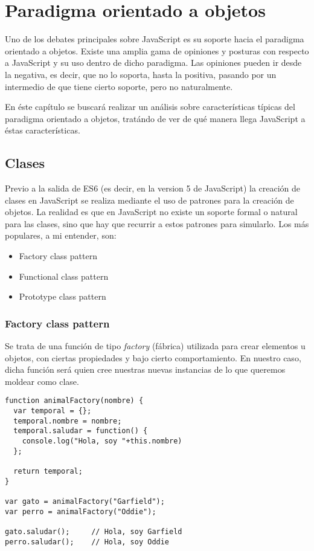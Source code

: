 \chapter{Paradigma orientado a objetos}

\label{Chapter4}


Uno de los debates principales sobre JavaScript es su soporte hacia el paradigma orientado a objetos. Existe una amplia gama de opiniones y posturas con respecto a JavaScript y su uso dentro de dicho paradigma. Las opiniones pueden ir desde la negativa, es decir, que no lo soporta, hasta la positiva, pasando por un intermedio de que tiene cierto soporte, pero no naturalmente.

En éste capítulo se buscará realizar un análisis sobre características típicas del paradigma orientado a objetos, tratándo de ver de qué manera llega JavaScript a éstas características.


\section{Clases}

Previo a la salida de ES6 (es decir, en la version 5 de JavaScript) la creación de clases en JavaScript se realiza mediante el uso de patrones para la creación de objetos. La realidad es que en JavaScript no existe un soporte formal o natural para las clases, sino que hay que recurrir a estos patrones para simularlo. Los más populares, a mi entender, son:

\begin{itemize}
	\item Factory class pattern
	\item Functional class pattern
	\item Prototype class pattern
\end{itemize}

\subsection{Factory class pattern}

Se trata de una función de tipo \textit{factory} (fábrica) utilizada para crear elementos u objetos, con ciertas propiedades y bajo cierto comportamiento. En nuestro caso, dicha función será quien cree nuestras nuevas instancias de lo que queremos moldear como clase.

\begin{lstlisting}[title={Factory class pattern}]
function animalFactory(nombre) {
  var temporal = {};
  temporal.nombre = nombre;
  temporal.saludar = function() {
    console.log("Hola, soy "+this.nombre)
  };

  return temporal;
}

var gato = animalFactory("Garfield");
var perro = animalFactory("Oddie");

gato.saludar();		// Hola, soy Garfield
perro.saludar();	// Hola, soy Oddie
\end{lstlisting}

